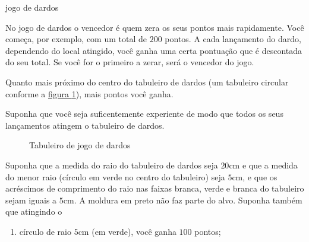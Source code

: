 \begin{task}{jogo de dardos}



No jogo de dardos o vencedor é quem zera os seus pontos mais rapidamente. Você começa, por exemplo, com um total de $200$ pontos. A cada lançamento do dardo, dependendo do local atingido, você ganha uma certa pontuação que é descontada do seu total. Se você for o primeiro a zerar, será o vencedor do jogo.

Quanto mais próximo do centro do tabuleiro de dardos (um tabuleiro circular conforme a \hyperref[dardos]{figura \ref{dardos}}), mais pontos você ganha.

Suponha que você seja suficentemente experiente de modo que todos os seus lançamentos atingem o tabuleiro de dardos.

\begin{figure}[H]
\centering


\caption{Tabuleiro de jogo de dardos}
\label{dardos}
\end{figure}

Suponha que a medida do raio do tabuleiro de dardos seja $20$cm e que a medida do menor raio (círculo em verde no centro do tabuleiro) seja $5$cm, e que os acréscimos de comprimento do raio nas faixas branca, verde e branca do tabuleiro sejam iguais a $5$cm. A moldura em preto não faz parte do alvo. Suponha também que atingindo o
\begin{enumerate}
\item {} 
círculo de raio $5$cm (em verde), você ganha $100$ pontos;


\end{enumerate}
\end{task}

